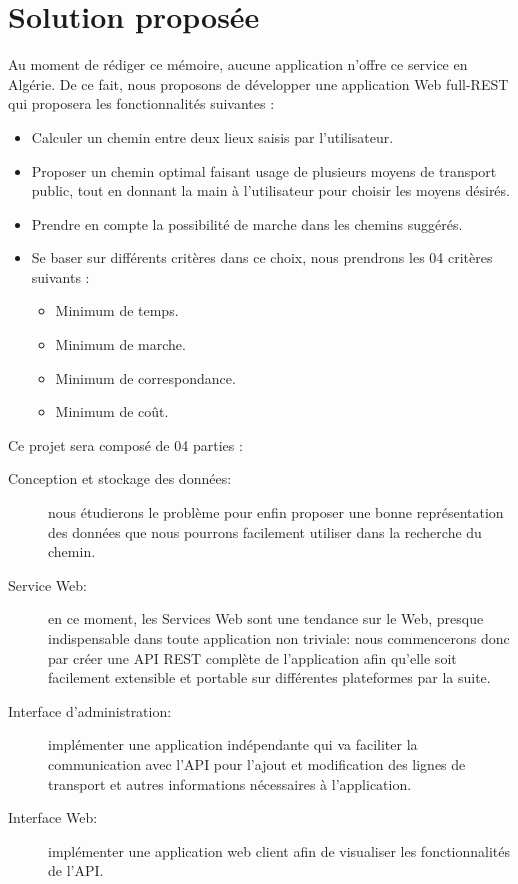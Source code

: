 \section{Solution proposée}
Au moment de rédiger ce mémoire, aucune application n'offre ce service en Algérie. \newline
De ce fait, nous proposons de développer une application Web full-REST qui proposera les fonctionnalités suivantes : 

\begin{itemize}
	\item Calculer un chemin entre deux lieux saisis par l'utilisateur.
	\item Proposer un chemin optimal faisant usage de plusieurs moyens de transport public, tout en donnant la main à l'utilisateur pour choisir les moyens désirés.
	\item Prendre en compte la possibilité de marche dans les chemins suggérés.
	\item Se baser sur différents critères dans ce choix, nous prendrons les 04 critères suivants : 
	\begin{itemize}
		\item Minimum de temps.
		\item Minimum de marche.
		\item Minimum de correspondance.
		\item Minimum de coût.\newline
	\end{itemize}	 
\end{itemize}
Ce projet sera composé de 04 parties :\newline
\begin{description}
	\item[Conception et stockage des données: ] nous étudierons le problème pour enfin proposer une bonne représentation des données que nous pourrons facilement utiliser dans la recherche du chemin.

	\item[Service Web: ] en ce moment, les Services Web sont une tendance sur le Web, presque indispensable dans toute application non triviale: nous commencerons donc par créer une API REST complète de l'application afin qu'elle soit facilement extensible et portable sur différentes plateformes par la suite.
	
	\item[Interface d'administration: ] implémenter une application indépendante qui va faciliter la  communication avec l'API pour l'ajout et modification des lignes de transport et autres informations nécessaires à l'application.
	
	
	\item[Interface Web: ] implémenter une application web client afin de visualiser les fonctionnalités de l'API.
\end{description}

